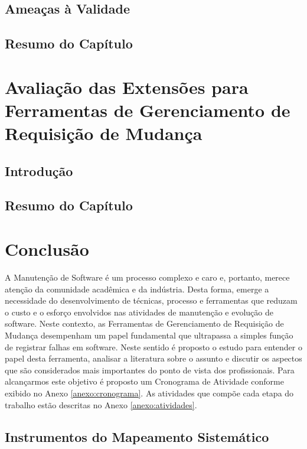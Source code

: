 \documentclass[msc]{ppgccufmg} %
\begin{document}
\section{Ameaças à Validade}

\section{Resumo do Capítulo}

\chapter{Avaliação das Extensões para Ferramentas de Gerenciamento de Requisição de Mudança}

\section{Introdução}

\section{Resumo do Capítulo}

\chapter{Conclusão}
\label{ch:conclusao_trab_futuros}

A Manutenção de Software é um processo complexo e caro e, portanto,  merece atenção da
comunidade acadêmica e da indústria. Desta forma, emerge a necessidade do desenvolvimento de técnicas, processo e ferramentas que reduzam o custo e o esforço envolvidos nas atividades de manutenção e evolução de software. Neste contexto, as Ferramentas de Gerenciamento de Requisição de Mudança desempenham um papel fundamental que ultrapassa a simples função de registrar falhas em software. Neste sentido é proposto o estudo para entender o papel desta ferramenta, analisar a literatura sobre o assunto e discutir os aspectos que são considerados mais importantes do ponto de vista dos profissionais. Para alcançarmos este objetivo é proposto um Cronograma de Atividade conforme exibido no Anexo \ref{anexo:cronograma}. As atividades que compõe cada etapa do trabalho estão descritas no Anexo \ref{anexo:atividades}.



\begin{appendices}
	\chapter{Instrumentos do Mapeamento Sistemático}
	 \label{ch:app-instrumentos-mapeamento}
	 
\end{appendices}
\end{document}
